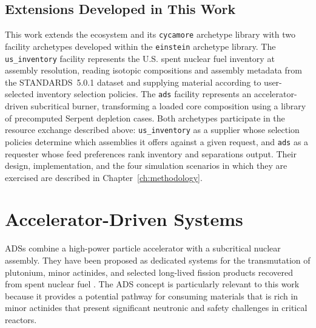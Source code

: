 \subsection{Extensions Developed in This Work}
\label{subsec:cyclus-extensions}

This work extends the \Cyclus ecosystem and its \texttt{cycamore} archetype library
\cite{carlsen_cycamore_2014} with two facility archetypes developed
within the \texttt{einstein} archetype library. The \texttt{us\_inventory}
facility represents the U.S. spent nuclear fuel inventory at assembly
resolution, reading isotopic compositions and assembly metadata from the
\gls{STANDARDS}~5.0.1 dataset \cite{peterson_unf-st&dards_2017,peterson_additional_2017}
and supplying material according to user-selected inventory selection policies.
The \texttt{ads} facility represents an accelerator-driven subcritical burner, transforming a
loaded core composition using a library of precomputed Serpent depletion
cases. Both archetypes participate in the resource exchange described above:
\texttt{us\_inventory} as a supplier whose selection policies determine which
assemblies it offers against a given request, and \texttt{ads} as a requester
whose feed preferences rank inventory and separations output. Their design,
implementation, and the four simulation scenarios in which they are exercised
are described in Chapter~\ref{ch:methodology}.



\section{Accelerator-Driven Systems}
\label{sec:ads}

\glspl{ADS} combine a high-power particle accelerator
with a subcritical nuclear assembly. They have been proposed as dedicated
systems for the transmutation of plutonium, minor actinides, and selected
long-lived fission products recovered from spent nuclear fuel
\cite{iaea_ma_fuels_2009}.
The \gls{ADS} concept is particularly relevant to this work because it provides a
potential pathway for consuming materials that is rich in minor actinides that present
significant neutronic and safety challenges in critical reactors.

